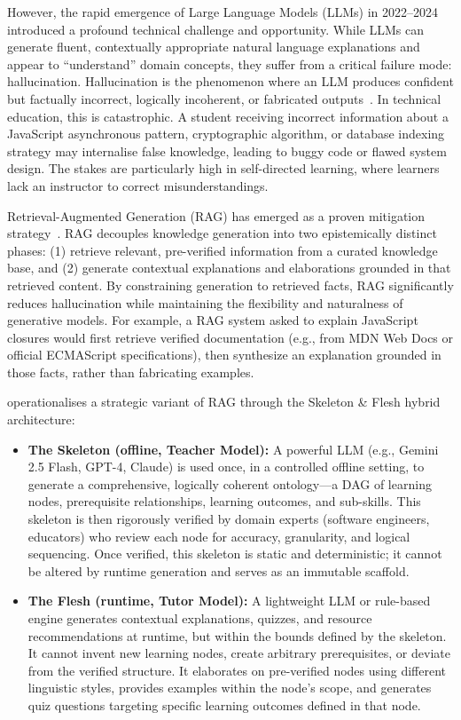 However, the rapid emergence of Large Language Models (LLMs) in 2022--2024 introduced a profound technical challenge and opportunity. While LLMs can generate fluent, contextually appropriate natural language explanations and appear to \enquote{understand} domain concepts, they suffer from a critical failure mode: hallucination. Hallucination is the phenomenon where an LLM produces confident but factually incorrect, logically incoherent, or fabricated outputs~\cite{marcus2020, weidinger2021}. In technical education, this is catastrophic. A student receiving incorrect information about a JavaScript asynchronous pattern, cryptographic algorithm, or database indexing strategy may internalise false knowledge, leading to buggy code or flawed system design. The stakes are particularly high in self-directed learning, where learners lack an instructor to correct misunderstandings.

Retrieval-Augmented Generation (RAG) has emerged as a proven mitigation strategy~\cite{lewis2020}. RAG decouples knowledge generation into two epistemically distinct phases: (1) retrieve relevant, pre-verified information from a curated knowledge base, and (2) generate contextual explanations and elaborations grounded in that retrieved content. By constraining generation to retrieved facts, RAG significantly reduces hallucination while maintaining the flexibility and naturalness of generative models. For example, a RAG system asked to explain JavaScript closures would first retrieve verified documentation (e.g., from MDN Web Docs or official ECMAScript specifications), then synthesize an explanation grounded in those facts, rather than fabricating examples.

\projectname{} operationalises a strategic variant of RAG through the Skeleton \& Flesh hybrid architecture:

\begin{itemize}
    \item \textbf{The Skeleton (offline, Teacher Model):} A powerful LLM (e.g., Gemini 2.5 Flash, GPT-4, Claude) is used once, in a controlled offline setting, to generate a comprehensive, logically coherent ontology---a DAG of learning nodes, prerequisite relationships, learning outcomes, and sub-skills. This skeleton is then rigorously verified by domain experts (software engineers, educators) who review each node for accuracy, granularity, and logical sequencing. Once verified, this skeleton is static and deterministic; it cannot be altered by runtime generation and serves as an immutable scaffold.
    \item \textbf{The Flesh (runtime, Tutor Model):} A lightweight LLM or rule-based engine generates contextual explanations, quizzes, and resource recommendations at runtime, but within the bounds defined by the skeleton. It cannot invent new learning nodes, create arbitrary prerequisites, or deviate from the verified structure. It elaborates on pre-verified nodes using different linguistic styles, provides examples within the node's scope, and generates quiz questions targeting specific learning outcomes defined in that node.
\end{itemize}

